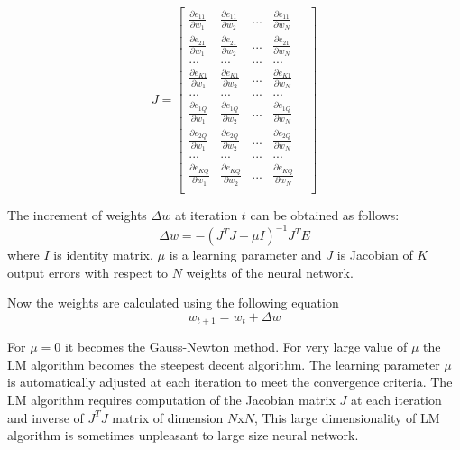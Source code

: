 \documentclass[12pt,a4paper,oneside]{article}
\numberwithin{equation}{section}
\numberwithin{algorithm}{section}
\begin{document}
	\begin{equation}\label{jacobian_matrix}
	 J=
	\begin{bmatrix}
	\frac{\partial{e_{11}}}{\partial{w_{1}}} & \frac{\partial{e_{11}}}{\partial{w_{2}}} & ... & \frac{\partial{e_{11}}}{\partial{w_{N}}} \\
	
	\frac{\partial{e_{21}}}{\partial{w_{1}}} & \frac{\partial{e_{21}}}{\partial{w_{2}}} & ... & \frac{\partial{e_{21}}}{\partial{w_{N}}} \\
	
	...&...&...&...&\\
	
	\frac{\partial{e_{K1}}}{\partial{w_{1}}} & \frac{\partial{e_{K1}}}{\partial{w_{2}}} & ... & \frac{\partial{e_{K1}}}{\partial{w_{N}}} \\
	
	...&...&...&...&\\
	
	\frac{\partial{e_{1Q}}}{\partial{w_{1}}} & \frac{\partial{e_{1Q}}}{\partial{w_{2}}} & ... & \frac{\partial{e_{1Q}}}{\partial{w_{N}}} \\
	
	\frac{\partial{e_{2Q}}}{\partial{w_{1}}} & \frac{\partial{e_{2Q}}}{\partial{w_{2}}} & ... & \frac{\partial{e_{2Q}}}{\partial{w_{N}}} \\
	...&...&...&...&\\
	
	\frac{\partial{e_{KQ}}}{\partial{w_{1}}} & \frac{\partial{e_{KQ}}}{\partial{w_{2}}} & ... & \frac{\partial{e_{KQ}}}{\partial{w_{N}}} \\
	\end{bmatrix}
	\end{equation}
	
	The increment of weights $\Delta{w}$ at iteration $t$ can be obtained as follows:
	\begin{equation}\label{equation_delta_w}
	\Delta{w}=-(J^TJ+\mu I)^{-1}J^TE
	\end{equation}
	where $I$ is identity matrix, $\mu$ is a learning parameter and $J$ is Jacobian of $K$ output errors with respect to $N$ weights of the neural network.
	
	Now the weights are calculated using the following equation
	\begin{equation}\label{equation_new_weight}
	w_{t+1}=w_t+\Delta{w}
	\end{equation}
	
	
	 For $\mu=0$ it becomes the Gauss-Newton method. For very large value of $\mu$ the LM algorithm becomes the steepest decent algorithm. The learning parameter $\mu$  is automatically adjusted at each iteration to meet the convergence criteria. The LM algorithm requires computation of the Jacobian matrix $J$ at each iteration and inverse of $J^TJ$ matrix of dimension $N$x$N$, This large dimensionality of LM algorithm is sometimes unpleasant to large size neural network.
	
\end{document}
